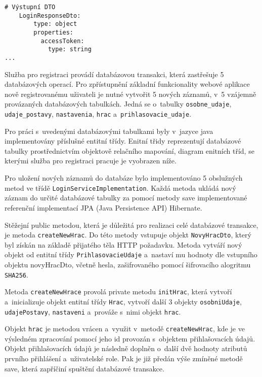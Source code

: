 \documentclass[12pt]{article}
\begin{document}
{\begin{lstlisting}
# Výstupní DTO 
    LoginResponseDto:
        type: object
        properties:
          accessToken:
            type: string
...
\end{lstlisting}

Služba pro registraci provádí databázovou transakci,
která zastřešuje 5 databázových operací. 
Pro zpřístupnění základní funkcionality webové aplikace nově registrovanému uživateli je nutné vytvořit 5 nových záznamů,
v~5 vzájemně provázaných databázových tabulkách.
Jedná se o~tabulky \texttt{osobne\_udaje},
\texttt{udaje\_postavy}, \texttt{nastavenia}, \texttt{hrac} a~\texttt{prihlasovacie\_udaje}.

Pro práci s~uvedenými databázovými tabulkami byly v~jazyce java implementovány příslušné entitní třídy.
Enitní třidy reprezentují databázové tabulky prostřednictvím objektově relačního mapování,
diagram enitních tříd, se kterými služba pro registraci pracuje je vyobrazen níže.

\obrazek
{}

\clearpage

Pro uložení nových záznamů do databáze bylo implementováno 5 obslužných metod ve třídě \texttt{LoginServiceImplementation}.
Každá metoda ukládá nový záznam do určité databázové tabulky
za pomocí metody save implementované referenční implementací JPA (Java Persistence API) Hibernate.

Stěžejní public metodou, která je důležitá pro realizaci celé databázové transakce, je metoda \texttt{createNewHrac}.
Do této metody vstupuje objekt \texttt{NovyHracDto}, který byl získán na základě přijatého těla HTTP požadavku.
Metoda vytváří nový objekt od entitní třídy \texttt{PrihlasovacieUdaje} a~nastaví mu hodnoty dle vstupního objektu novyHracDto,
včetně hesla, zašifrovaného pomocí šifrovacího alogritmu \texttt{SHA256}.

Metoda \texttt{createNewHrace} provolá private metodu \texttt{initHrac},
která vytvoří a~inicializuje objekt entitní třídy \texttt{Hrac}, vytvoří další 3 objekty \texttt{osobniUdaje}, \texttt{udajePostavy}, \texttt{nastaveni}
a~prováže s~nimi objekt \texttt{hrac}.

Objekt \texttt{hrac} je metodou vrácen a~využit v~metodě \texttt{createNewHrac},
kde je ve výsledném zpracování pomocí jeho id provozán s~objektem přihlašovacích údajů.
Objekt přihlašovacích údajů je následně doplněn o~další dvě hodnoty atributů prvního přihlášení a~uživatelské role.
Pak je již předán výše zmíněné metodě save, která zapříčiní spuštění databázové transakce.

}
\end{document}

